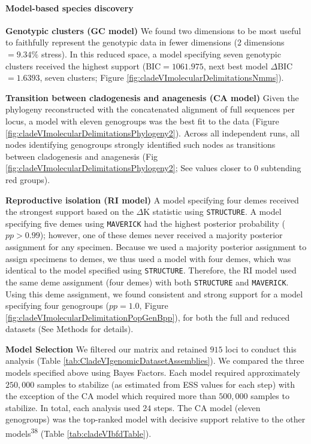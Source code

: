 \documentclass[
  11pt,
]{article}
\begin{document}
\hypertarget{model-based-species-discovery-11}{%
\paragraph{Model-based species discovery}\label{model-based-species-discovery-11}}

\textbf{Genotypic clusters (GC model)} We found two dimensions to be most useful to faithfully represent the genotypic data in fewer dimensions (2 dimensions \(= 9.34\%\) stress). In this reduced space, a model specifying seven genotypic clusters received the highest support (BIC\(=1061.975\), next best model \(\Delta\)BIC\(=1.6393\), seven clusters; Figure \ref{fig:cladeVImolecularDelimitationsNmms}).

\textbf{Transition between cladogenesis and anagenesis (CA model)} Given the phylogeny reconstructed with the concatenated alignment of full sequences per locus, a model with eleven genogroups was the best fit to the data (Figure \ref{fig:cladeVImolecularDelimitationsPhylogeny2}). Across all independent runs, all nodes identifying genogroups strongly identified such nodes as transitions between cladogenesis and anagenesis (Fig \ref{fig:cladeVImolecularDelimitationsPhylogeny2}; See values closer to \(0\) subtending red groups).

\textbf{Reproductive isolation (RI model)} A model specifying four demes received the strongest support based on the \(\Delta\)K statistic using \texttt{STRUCTURE}. A model specifying five demes using \texttt{MAVERICK} had the highest posterior probability (\(pp>0.99\)); however, one of these demes never received a majority posterior assignment for any specimen. Because we used a majority posterior assignment to assign specimens to demes, we thus used a model with four demes, which was identical to the model specified using \texttt{STRUCTURE}. Therefore, the RI model used the same deme assignment (four demes) with both \texttt{STRUCTURE} and \texttt{MAVERICK}. Using this deme assignment, we found consistent and strong support for a model specifying four genogroups (\(pp=1.0\), Figure \ref{fig:cladeVImolecularDelimitationPopGenBpp}), for both the full and reduced datasets (See Methods for details).

\textbf{Model Selection} We filtered our matrix and retained \(915\) loci to conduct this analysis (Table \ref{tab:CladeVIgenomicDatasetAssemblies}). We compared the three models specified above using Bayes Factors. Each model required approximately \(250,000\) samples to stabilize (as estimated from ESS values for each step) with the exception of the CA model which required more than \(500,000\) samples to stabilize. In total, each analysis used \(24\) steps. The CA model (eleven genogroups) was the top-ranked model with decisive support relative to the other models\textsuperscript{38} (Table \ref{tab:cladeVIbfdTable}).
\end{document}
